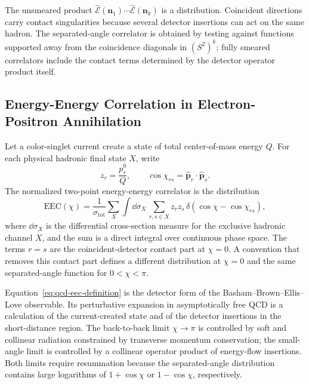 The unsmeared product
\(\widehat{\mathcal E}(\mathbf n_1)\cdots
\widehat{\mathcal E}(\mathbf n_k)\) is a distribution.  Coincident directions
carry contact singularities because several detector insertions can act on the
same hadron.  The separated-angle correlator is obtained by testing against
functions supported away from the coincidence diagonals in \((S^2)^k\); fully
smeared correlators include the contact terms determined by the detector
operator product itself.

\subsection{Energy-Energy Correlation in Electron-Positron Annihilation}

Let a color-singlet current create a state of total center-of-mass energy
\(Q\).  For each physical hadronic final state \(X\), write
\[
  z_r=\frac{p_r^0}{Q},
  \qquad
  \cos\chi_{rs}=
  \widehat{\mathbf p}_r\cdot\widehat{\mathbf p}_s .
\]
The normalized two-point energy-energy correlator is the distribution
\begin{equation}
  \mathrm{EEC}(\chi)
  =
  \frac{1}{\sigma_{\mathrm{tot}}}
  \sum_X
  \int \dd\sigma_X\,
  \sum_{r,s\in X}
  z_r z_s\,
  \delta(\cos\chi-\cos\chi_{rs}),
  \label{eq:qcd-eec-definition}
\end{equation}
where \(\dd\sigma_X\) is the differential cross-section measure for the
exclusive hadronic channel \(X\), and the sum is a direct integral over
continuous phase space.  The terms \(r=s\) are the coincident-detector contact
part at \(\chi=0\).  A convention that removes this contact part defines a
different distribution at \(\chi=0\) and the same separated-angle function for
\(0<\chi<\pi\).

Equation~\eqref{eq:qcd-eec-definition} is the detector form of the
Basham--Brown--Ellis--Love observable.  Its perturbative expansion in
asymptotically free QCD is a calculation of the current-created state and of
the detector insertions in the short-distance region.  The back-to-back limit
\(\chi\to\pi\) is controlled by soft and collinear radiation constrained by
transverse momentum conservation; the small-angle limit is controlled by a
collinear operator product of energy-flow insertions.  Both limits require
resummation because the separated-angle distribution contains large logarithms
of \(1+\cos\chi\) or \(1-\cos\chi\), respectively.


